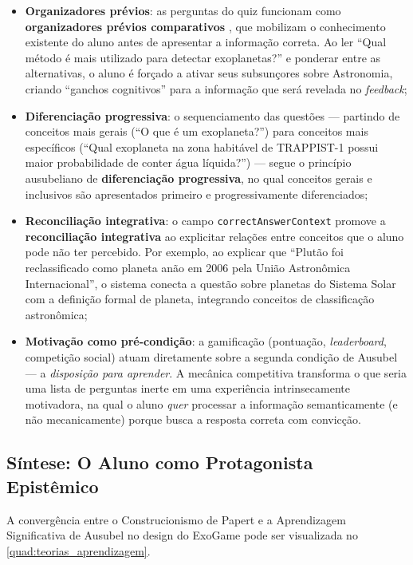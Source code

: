 \documentclass[
	12pt,
	openany,
	oneside,
	a4paper,
	english,
	brazil
]{abntex2}
\begin{document}
\begin{itemize}
  \item \textbf{Organizadores prévios}: as perguntas do quiz funcionam como \textbf{organizadores prévios comparativos} \cite{ausubel1968}, que mobilizam o conhecimento existente do aluno antes de apresentar a informação correta. Ao ler ``Qual método é mais utilizado para detectar exoplanetas?'' e ponderar entre as alternativas, o aluno é forçado a ativar seus subsunçores sobre Astronomia, criando ``ganchos cognitivos'' para a informação que será revelada no \textit{feedback};

  \item \textbf{Diferenciação progressiva}: o sequenciamento das questões --- partindo de conceitos mais gerais (``O que é um exoplaneta?'') para conceitos mais específicos (``Qual exoplaneta na zona habitável de TRAPPIST-1 possui maior probabilidade de conter água líquida?'') --- segue o princípio ausubeliano de \textbf{diferenciação progressiva}, no qual conceitos gerais e inclusivos são apresentados primeiro e progressivamente diferenciados;

  \item \textbf{Reconciliação integrativa}: o campo \texttt{correctAnswerContext} promove a \textbf{reconciliação integrativa} ao explicitar relações entre conceitos que o aluno pode não ter percebido. Por exemplo, ao explicar que ``Plutão foi reclassificado como planeta anão em 2006 pela União Astronômica Internacional'', o sistema conecta a questão sobre planetas do Sistema Solar com a definição formal de planeta, integrando conceitos de classificação astronômica;

  \item \textbf{Motivação como pré-condição}: a gamificação (pontuação, \textit{leaderboard}, competição social) atuam diretamente sobre a segunda condição de Ausubel --- a \textit{disposição para aprender}. A mecânica competitiva transforma o que seria uma lista de perguntas inerte em uma experiência intrinsecamente motivadora, na qual o aluno \textit{quer} processar a informação semanticamente (e não mecanicamente) porque busca a resposta correta com convicção.
\end{itemize}

\subsection{Síntese: O Aluno como Protagonista Epistêmico}

A convergência entre o Construcionismo de Papert e a Aprendizagem Significativa de Ausubel no design do ExoGame pode ser visualizada no \autoref{quad:teorias_aprendizagem}.
\end{document}
